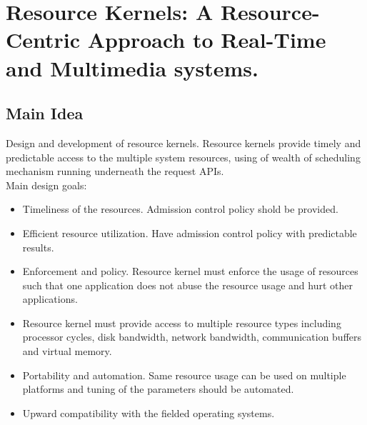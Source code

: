 
\section{Resource Kernels: A Resource-Centric Approach to Real-Time and Multimedia systems.}
\subsection*{Main Idea}
Design and development of resource kernels. Resource kernels provide timely and predictable access to the multiple system resources, using of wealth of scheduling mechanism running underneath the request APIs.\\
Main design goals:
\begin{itemize}
	\item Timeliness of the resources. Admission control policy shold be provided.
	\item Efficient resource utilization. Have admission control policy with predictable results.
	\item Enforcement and policy. Resource kernel must enforce the usage of resources such that one application does not abuse the resource usage and hurt other applications.
	\item Resource kernel must provide access to multiple resource types including processor cycles, disk bandwidth, network bandwidth, communication buffers and virtual memory.
	\item Portability and automation. Same resource usage can be used on multiple platforms and tuning of the parameters should be automated.
	\item Upward compatibility with the fielded operating systems.
\end{itemize}
